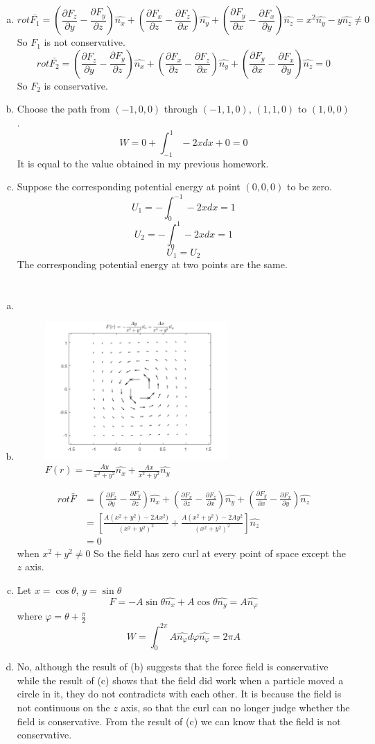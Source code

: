 \documentclass{article}
\newcommand{\curl}{\left(\frac{\partial F_z}{\partial y}-\frac{\partial F_y}{\partial z}\right)\hat{n_x}+\left(\frac{\partial F_x}{\partial z}-\frac{\partial F_z}{\partial x}\right)\hat{n_y}+\left(\frac{\partial F_y}{\partial x}-\frac{\partial F_x}{\partial y}\right)\hat{n_z}}
\begin{document}
\section{}
\begin{enumerate}[(a)]
	\item
	$$rot\bar{F_1}=\curl=x^2\hat{n_y}-y\hat{n_z}\neq0$$
	So $F_1$ is not conservative.
	$$rot\bar{F_2}=\curl=0$$
	So $F_2$ is conservative.
	\item
	Choose the path from $(-1,0,0)$ through $(-1,1,0)$, $(1,1,0)$ to $(1,0,0)$.
	$$W=0+\int_{-1}^1-2xdx+0=0$$
	It is equal to the value obtained in my previous homework.
	\item
	Suppose the corresponding potential energy at point $(0,0,0)$ to be zero.
	$$U_1=-\int_0^{-1}-2xdx=1$$
	$$U_2=-\int_0^{1}-2xdx=1$$
	$$U_1=U_2$$
	The corresponding potential energy at two points are the same.
\end{enumerate}

\section{}
\begin{enumerate}[(a)]
	\item
	\item
	\begin{figure}[h!]
		\centering
		\includegraphics[width=7cm]{p2_a.png}
		\caption{$F(r)=-\frac{Ay}{x^2+y^2}\hat{n_x}+\frac{Ax}{x^2+y^2}\hat{n_y}$}
		\label{fig-2-a}
	\end{figure}
	\begin{align*}
	rot\bar{F}&=\curl\\
	&=\left[\frac{A(x^2+y^2)-2Ax^2)}{(x^2+y^2)^2}+\frac{A(x^2+y^2)-2Ay^2}{(x^2+y^2)^2}\right]\hat{n_z}\\
	&=0
	\end{align*}
	when $x^2+y^2\neq0$
	So the field has zero curl at every point of space except the $z$ axis.
	\item
	Let $x=\cos\theta$, $y=\sin\theta$
	$$F=-A\sin\theta\hat{n_x}+A\cos\theta\hat{n_y}=A\hat{n_{\varphi}}$$
	where $\varphi=\theta+\frac{\pi}{2}$
	$$W=\int_0^{2\pi}A\hat{n_{\varphi}}d\varphi\hat{n_{\varphi}}=2\pi A$$
	\item
	No, although the result of (b) suggests that the force field is conservative while the result of (c) shows that the field did work when a particle moved a circle in it, they do not contradicts with each other. It is because the field is not continuous on the $z$ axis, so that the curl can no longer judge whether the field is conservative. From the result of (c) we can know that the field is not conservative.
	
\end{enumerate}
\end{document}
